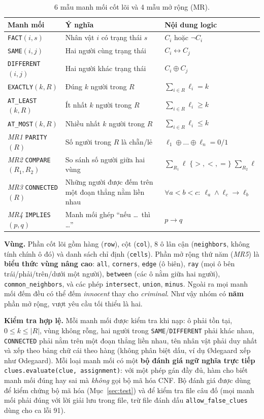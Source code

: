 \documentclass{article}
\newcommand{\code}[1]{\texttt{#1}}
\begin{document}
\begin{table}[H]
\centering\small
\renewcommand{\arraystretch}{1.25}
\begin{tabularx}{\textwidth}{l X l}
\toprule
\textbf{Manh mối} & \textbf{Ý nghĩa} & \textbf{Nội dung logic} \\
\midrule
\code{FACT}$(i,s)$ & Nhân vật $i$ có trạng thái $s$ & $C_i$ hoặc $\neg C_i$ \\
\code{SAME}$(i,j)$ & Hai người cùng trạng thái & $C_i \leftrightarrow C_j$ \\
\code{DIFFERENT}$(i,j)$ & Hai người khác trạng thái & $C_i \oplus C_j$ \\
\code{EXACTLY}$(k,R)$ & Đúng $k$ người trong $R$ & $\sum_{i\in R} \ell_i = k$ \\
\code{AT\_LEAST}$(k,R)$ & Ít nhất $k$ người trong $R$ & $\sum_{i\in R} \ell_i \ge k$ \\
\code{AT\_MOST}$(k,R)$ & Nhiều nhất $k$ người trong $R$ & $\sum_{i\in R} \ell_i \le k$ \\
\midrule
\textit{MR1} \code{PARITY}$(R)$ & Số người trong $R$ là chẵn/lẻ & $\ell_1 \oplus \dots \oplus \ell_n = 0/1$ \\
\textit{MR2} \code{COMPARE}$(R_1,R_2)$ & So sánh số người giữa hai vùng & $\sum_{R_1}\ell \;\{>,<,=\}\; \sum_{R_2}\ell$ \\
\textit{MR3} \code{CONNECTED}$(R)$ & Những người được đếm trên một đoạn thẳng nằm liền nhau & $\forall a<b<c:\ \ell_a \land \ell_c \to \ell_b$ \\
\textit{MR4} \code{IMPLIES}$(p,q)$ & Manh mối ghép ``nếu \dots\ thì \dots'' & $p \to q$ \\
\bottomrule
\end{tabularx}
\caption{6 mẫu manh mối cốt lõi và 4 mẫu mở rộng (MR).}
\end{table}

\textbf{Vùng.} Phần cốt lõi gồm hàng (\code{row}), cột (\code{col}), 8 ô lân cận (\code{neighbors}, không tính chính ô đó) và danh sách chỉ định (\code{cells}). Phần mở rộng thứ năm (\textit{MR5}) là \textbf{biểu thức vùng nâng cao}: \code{all}, \code{corners}, \code{edge} (ô biên), \code{ray} (mọi ô bên trái/phải/trên/dưới một người), \code{between} (các ô nằm giữa hai người), \code{common\_neighbors}, và các phép \code{intersect}, \code{union}, \code{minus}. Ngoài ra mọi manh mối đếm đều có thể đếm \textit{innocent} thay cho \textit{criminal}. Như vậy nhóm có \textbf{năm} phần mở rộng, vượt yêu cầu tối thiểu là hai.

\textbf{Kiểm tra hợp lệ.} Mỗi manh mối được kiểm tra khi nạp: ô phải tồn tại, $0 \le k \le |R|$, vùng không rỗng, hai người trong \code{SAME}/\code{DIFFERENT} phải khác nhau, \code{CONNECTED} phải nằm trên một đoạn thẳng liền nhau, tên nhân vật phải duy nhất và xếp theo bảng chữ cái theo hàng (không phân biệt dấu, ví dụ Ødegaard xếp như Odegaard). Mỗi loại manh mối có một \textbf{bộ đánh giá ngữ nghĩa trực tiếp} \code{clues.evaluate(clue, assignment)}: với một phép gán đầy đủ, hàm cho biết manh mối đúng hay sai mà \textit{không} gọi bộ mã hóa CNF. Bộ đánh giá được dùng để kiểm chứng bộ mã hóa (Mục~\ref{sec:test}) và để kiểm tra file câu đố (mọi manh mối phải đúng với lời giải lưu trong file, trừ file đánh dấu \code{allow\_false\_clues} dùng cho ca lỗi 91).
\end{document}
